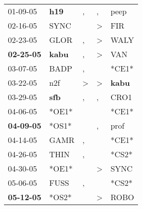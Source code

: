 \begin{supertabular}{p{0.07\textwidth}p{0.06\textwidth}p{0.02\textwidth}p{0.02\textwidth}p{0.06\textwidth}}
          01-09-05\textsuperscript{} &   \textbf{h19\textsuperscript{}} &                , &                , &           peep\textsuperscript{} \\
          02-16-05\textsuperscript{} &           SYNC\textsuperscript{} &                  &     \textgreater &            FIR\textsuperscript{} \\
          02-23-05\textsuperscript{} &           GLOR\textsuperscript{} &                , &     \textgreater &           WALY\textsuperscript{} \\
 \textbf{02-25-05\textsuperscript{}} &  \textbf{kabu\textsuperscript{}} &                , &     \textgreater &            VAN\textsuperscript{} \\
          03-07-05\textsuperscript{} &           BADP\textsuperscript{} &                , &                  &                            *CE1* \\
          03-22-05\textsuperscript{} &            n2f\textsuperscript{} &     \textgreater &     \textgreater &  \textbf{kabu\textsuperscript{}} \\
          03-29-05\textsuperscript{} &   \textbf{sfb\textsuperscript{}} &                , &                , &           CRO1\textsuperscript{} \\
          04-06-05\textsuperscript{} &                            *OE1* &                  &                  &                            *CE1* \\
 \textbf{04-09-05\textsuperscript{}} &                            *OS1* &                  &                , &           prof\textsuperscript{} \\
          04-14-05\textsuperscript{} &           GAMR\textsuperscript{} &                , &                  &                            *CE1* \\
          04-26-05\textsuperscript{} &           THIN\textsuperscript{} &                , &                  &                            *CS2* \\
          04-30-05\textsuperscript{} &                            *OE1* &                  &     \textgreater &           SYNC\textsuperscript{} \\
          05-06-05\textsuperscript{} &           FUSS\textsuperscript{} &                , &                  &                            *CS2* \\
 \textbf{05-12-05\textsuperscript{}} &                            *OS2* &                  &     \textgreater &           ROBO\textsuperscript{} \\

\end{supertabular}

